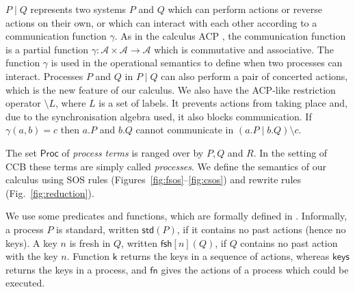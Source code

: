 \documentclass[runningheads]{llncs}
\newcommand{\Proc}{\mathsf{Proc}}
\newcommand{\paral}{\; \vert \;}
\newcommand{\std}[1]{\mathsf{std}(#1)}
\newcommand{\freshpred}[1]{\mathsf{fsh}[#1]}
\begin{document}
$P\paral Q$ represents two systems $P$ and $Q$ which can perform actions or reverse actions on
their own, or which can interact with each other according to a communication function
$\gamma$. As in the calculus ACP \cite{ACPBook}, the communication function is a partial function 
$\gamma: \mathcal A \times \mathcal A \rightarrow \mathcal A$ which is commutative and associative. The function
$\gamma$ is used in the operational semantics to define when two processes can interact. Processes 
$P$ and $Q$ in $P\paral Q$ can also perform a pair of concerted actions,
which is the new feature of our calculus.  We also have the ACP-like restriction operator 
$\setminus L$, where $L$ is a set of labels. It prevents actions from taking place and, due to 
the synchronisation algebra used, it also blocks communication. If $\gamma(a,b)=c$ then $a.P$ and $b.Q$
cannot communicate in $(a.P\paral b.Q)\setminus c$.

The set $\Proc$ of \emph{process terms} is ranged over by $P,Q$ and $R$. 
In the setting of CCB these terms are simply called \emph{processes}. We define the semantics of our calculus using SOS rules (Figures~\ref{fig:fsos}--\ref{fig:csos}) and rewrite rules (Fig.~\ref{fig:reduction}).

We use some predicates and functions, which are formally defined in \cite{KUHN201818}. Informally, a process $P$ is standard, written $\std{P}$, if it contains no past actions (hence no keys). A key $n$ is fresh in $Q$, written $\freshpred{n}(Q)$, if $Q$ contains no past action with the key $n$. Function $\mathsf{k}$ returns the keys in a sequence of actions, 
whereas $\mathsf{keys}$ returns the keys in a process, and $\mathsf{fn}$ gives the actions of a process 
which could be executed.
\end{document}
